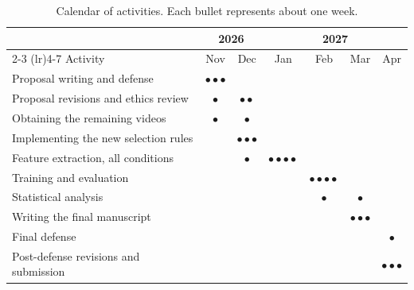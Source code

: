 \begin{table}[t]
   \centering
   \caption{Calendar of activities. Each bullet represents about one week.}
   \label{tab:timetableactivities}
   \small
   \begin{tabular}{lcccccc}
      \toprule
      & \multicolumn{2}{c}{2026} & \multicolumn{4}{c}{2027} \\
      \cmidrule(lr){2-3} \cmidrule(lr){4-7}
      Activity & Nov & Dec & Jan & Feb & Mar & Apr \\
      \midrule
      Proposal writing and defense & $\bullet\bullet\bullet$ & & & & & \\
      Proposal revisions and ethics review & $\bullet$ & $\bullet\bullet$ & & & & \\
      Obtaining the remaining videos & $\bullet$ & $\bullet$ & & & & \\
      Implementing the new selection rules & & $\bullet\bullet\bullet$ & & & & \\
      Feature extraction, all conditions & & $\bullet$ & $\bullet\bullet\bullet\bullet$ & & & \\
      Training and evaluation & & & & $\bullet\bullet\bullet\bullet$ & & \\
      Statistical analysis & & & & $\bullet$ & $\bullet$ & \\
      Writing the final manuscript & & & & & $\bullet\bullet\bullet$ & \\
      Final defense & & & & & & $\bullet$ \\
      Post-defense revisions and submission & & & & & & $\bullet\bullet\bullet$ \\
      \bottomrule
   \end{tabular}
\end{table}
